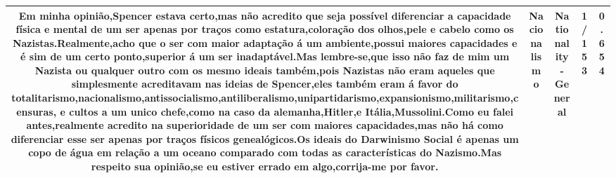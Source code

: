 \documentclass[11pt]{article}
\newlength\mylength
\begin{document}
\begin{center}
\begin{longtable}{|C{.65\mylength}|C{.30\mylength}|C{.12\mylength}|C{.12\mylength}|C{.12\mylength}|}
  \small Em minha opinião,Spencer estava certo,mas não acredito que seja possível diferenciar a capacidade física e mental de um ser apenas por traços como estatura,coloração dos olhos,pele e cabelo como os Nazistas.Realmente,acho que o ser com maior adaptação á um ambiente,possui maiores capacidades e é sim de um certo ponto,superior á um ser inadaptável.Mas lembre-se,que isso não faz de mim um Nazista ou qualquer outro com os mesmo ideais também,pois Nazistas não eram aqueles que simplesmente acreditavam nas ideias de Spencer,eles também eram á favor do totalitarismo,\textbf{nacionalismo},antissocialismo,antiliberalismo,unipartidarismo,expansionismo,militarismo,censuras, e cultos a um unico chefe,como na caso da alemanha,Hitler,e Itália,Mussolini.Como eu falei antes,realmente acredito na superioridade de um ser com maiores capacidades,mas não há como diferenciar esse ser apenas por traços físicos genealógicos.Os ideais do Darwinismo Social é apenas um copo de água em relação a um oceano comparado com todas as características do Nazismo.Mas respeito sua opinião,se eu estiver errado em algo,corrija-me por favor.\normalsize   & Nacionalismo & Nationality - General & 1/153 & 0.654 \\  \hline

\end{longtable}
\end{center}
\end{document}
